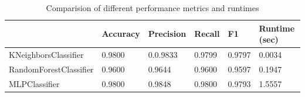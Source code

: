 \documentclass{article}
\begin{document}
\begin{table}[h]
\begin{center}
\begin{tabular}{|l|l|l|l|l|l|}
\hline
                       & Accuracy & Precision & Recall & F1     & Runtime (sec) \\ \hline
KNeighborsClassifier   & 0.9800   & 0.0.9833  & 0.9799 & 0.9797 & 0.0034        \\ \hline
RandomForestClassifier & 0.9600   & 0.9644    & 0.9600 & 0.9597 & 0.1947        \\ \hline
MLPClassifier          & 0.9800   & 0.9848    & 0.9800 & 0.9793 & 1.5557        \\ \hline
\end{tabular}
\caption{Comparision of different performance metrics and runtimes}
\end{center}
\end{table}
\end{document}
